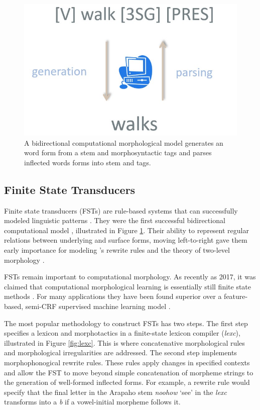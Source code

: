 \documentclass[12pt]{article}
\begin{document}
\bigskip
\begin{figure}[h!t]
\begin{center}
\includegraphics[width=0.5\columnwidth]{bidirectionalSYN.jpg}
\caption{A bidirectional computational morphological model generates an word form from a stem and morphosyntactic tags and parses inflected words forms into stem and tags.}
\label{fig:bidir}
\end{center}
\end{figure}


\subsection{Finite State Transducers}
\label{sec:FSTs}

Finite state transducers (FSTs) are rule-based systems that can successfully modeled linguistic patterns \cite{koskenniemi_two-level_1983,beesley_finite-state_2003,hulden_finite-state_2009}. They were the first successful bidirectional computational model \cite{goodman_generation_2013}, illustrated in Figure \ref{fig:bidir}. Their ability to represent regular relations between underlying and surface forms, moving left-to-right gave them early importance for modeling 's  rewrite rules and the theory of two-level morphology \cite{karttunen_2005}.

FSTs remain important to computational morphology. As recently as 2017, it was claimed that computational morphological learning is essentially still finite state methods \cite{goldsmith_computational_2017}. For many applications they have been found superior over a feature-based, semi-CRF supervised machine learning model \cite{cotterell_labeled_2015}.

The most popular methodology to construct FSTs has two steps. The first step specifies a lexicon and morphotactics in a finite-state lexicon compiler ({\it lexc}), illustrated in Figure \ref{fig:lexc}. This is where concatenative morphological rules and morphological irregularities are addressed. The second step implements morphophonogical rewrite rules. These rules apply changes in specified contexts and allow the FST to move beyond simple concatenation of morpheme strings to the generation of well-formed inflected forms. For example, a rewrite rule would specify that the final letter in the Arapaho stem \textit{noohow} `see' in the \textit{lexc} transforms into a \textit{b} if a vowel-initial morpheme follows it.
\end{document}
